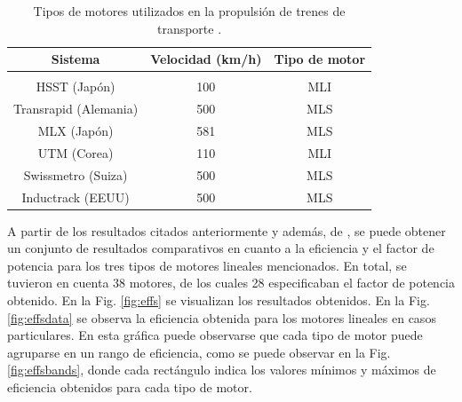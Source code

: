 \begin{table}[hbtp]
\caption{Tipos de motores utilizados en la propulsión de trenes de transporte \cite{leekimlee2006}.}
\centering
\begin{tabular}{c c c}
\textbf{Sistema} & \textbf{Velocidad (km/h)} & \textbf{Tipo de motor}\\
\hline \\
HSST (Japón) & 100 & MLI \\
Transrapid (Alemania) & 500 & MLS \\
MLX (Japón) & 581 & MLS \\
UTM (Corea) & 110 & MLI \\
Swissmetro (Suiza) & 500 & MLS \\
Inductrack (EEUU) & 500 & MLS \\
\end{tabular}
\label{lmtrains}
\end{table}

A partir de los resultados citados anteriormente y además, de \cite{hassanpour2008,vaezzadeh2006,shin2015,dongyeuplee2005,abdelaziz2008,perreault2009}, se puede obtener un conjunto de resultados comparativos en cuanto a la eficiencia y el factor de potencia para los tres tipos de motores lineales mencionados. En total, se tuvieron en cuenta 38 motores, de los cuales 28 especificaban el factor de potencia obtenido. En la Fig. \ref{fig:effs} se visualizan los resultados obtenidos. En la Fig. \ref{fig:effsdata} se observa la eficiencia obtenida para los motores lineales en casos particulares. En esta gráfica puede observarse que cada tipo de motor puede agruparse en un rango de eficiencia, como se puede observar en la Fig. \ref{fig:effsbands}, donde cada rectángulo indica los valores mínimos y máximos de eficiencia obtenidos para cada tipo de motor.

